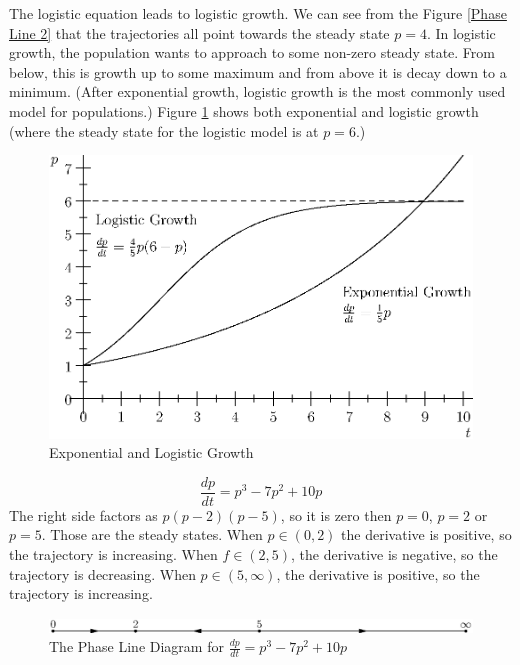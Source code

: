 \documentclass[fleqn]{report}
\begin{document}
The logistic equation leads to logistic growth. We can see
from the Figure \ref{Phase Line 2} that the trajectories
all point towards the steady state $p=4$. In logistic growth,
the population wants to approach to some non-zero steady
state. From below, this is growth up to some maximum and from
above it is decay down to a minimum. (After exponential
growth, logistic growth is the most commonly used model for
populations.) Figure \ref{Exponential and Logistic Growth}
shows both exponential and logistic growth (where the steady
state for the logistic model is at $p=6$.)

\begin{figure}[t]
\centering
\includegraphics[width=12cm]{figure44.eps}
\caption{Exponential and Logistic Growth}
\label{Exponential and Logistic Growth}
\end{figure}

\begin{example}
\begin{equation*}
\frac{dp}{dt} = p^3 -7p^2 + 10p
\end{equation*}
The right side factors as $p(p-2)(p-5)$, so it is zero then
$p=0$, $p=2$ or $p=5$. Those are the
steady states. When $p \in (0,2)$ the derivative is positive,
so the trajectory is increasing. When $f \in (2,5)$, the
derivative is negative, so the trajectory is decreasing. When
$p \in (5,\infty)$, the derivative is positive, so the
trajectory is increasing. 
\end{example}

\begin{figure}[ht]
\centering
\includegraphics[width=12cm]{figure42.eps}
\caption{The Phase Line Diagram for $\frac{dp}{dt} = p^3 -
7p^2 + 10p$}
\label{Phase Line 3}
\end{figure}
\end{document}
